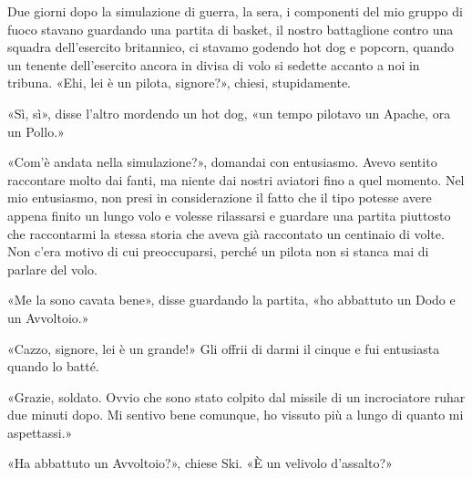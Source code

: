 Due giorni dopo la simulazione di guerra, la sera, i componenti del mio
gruppo di fuoco stavano guardando una partita di basket, il nostro
battaglione contro una squadra dell'esercito britannico, ci stavamo
godendo hot dog e popcorn, quando un tenente dell'esercito ancora in
divisa di volo si sedette accanto a noi in tribuna. «Ehi, lei è un
pilota, signore?», chiesi, stupidamente.

«Sì, sì», disse l'altro mordendo un hot dog, «un tempo pilotavo un
Apache, ora un Pollo.»

«Com'è andata nella simulazione?», domandai con entusiasmo. Avevo
sentito raccontare molto dai fanti, ma niente dai nostri aviatori fino a
quel momento. Nel mio entusiasmo, non presi in considerazione il fatto
che il tipo potesse avere appena finito un lungo volo e volesse
rilassarsi e guardare una partita piuttosto che raccontarmi la stessa
storia che aveva già raccontato un centinaio di volte. Non c'era motivo
di cui preoccuparsi, perché un pilota non si stanca mai di parlare del
volo.

«Me la sono cavata bene», disse guardando la partita, «ho abbattuto un
Dodo e un Avvoltoio.»

«Cazzo, signore, lei è un grande!» Gli offrii di darmi il cinque e fui
entusiasta quando lo batté.

«Grazie, soldato. Ovvio che sono stato colpito dal missile di un
incrociatore ruhar due minuti dopo. Mi sentivo bene comunque, ho vissuto
più a lungo di quanto mi aspettassi.»

«Ha abbattuto un Avvoltoio?», chiese Ski. «È un velivolo d'assalto?»

